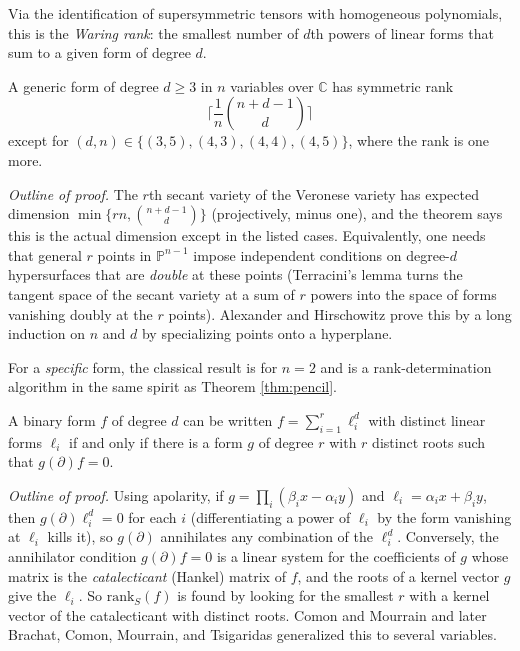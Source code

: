   Via the identification of supersymmetric tensors with homogeneous polynomials, this is the \textit{Waring rank}: the smallest number of $d$th powers of linear forms that sum to a given form of degree $d$.

  \begin{theorem}
    A generic form of degree $d \geq 3$ in $n$ variables over $\mathbb{C}$ has symmetric rank
    \begin{equation}
      \bigg\lceil \frac{1}{n} \binom{n + d - 1}{d} \bigg\rceil
    \end{equation}
    except for $(d, n) \in \{(3,5), (4,3), (4,4), (4,5)\}$, where the rank is one more.
  \end{theorem}

  \textit{Outline of proof.} The $r$th secant variety of the Veronese variety has expected dimension $\min\{r n, \binom{n+d-1}{d}\}$ (projectively, minus one), and the theorem says this is the actual dimension except in the listed cases. Equivalently, one needs that general $r$ points in $\mathbb{P}^{n-1}$ impose independent conditions on degree-$d$ hypersurfaces that are \textit{double} at these points (Terracini's lemma turns the tangent space of the secant variety at a sum of $r$ powers into the space of forms vanishing doubly at the $r$ points). Alexander and Hirschowitz prove this by a long induction on $n$ and $d$ by specializing points onto a hyperplane.

  For a \textit{specific} form, the classical result is for $n = 2$ and is a rank-determination algorithm in the same spirit as Theorem \ref{thm:pencil}.

  \begin{theorem}[Sylvester, 1851]
    A binary form $f$ of degree $d$ can be written $f = \sum_{i=1}^r \ell_i^d$ with distinct linear forms $\ell_i$ if and only if there is a form $g$ of degree $r$ with $r$ distinct roots such that $g(\partial) f = 0$.
  \end{theorem}

  \textit{Outline of proof.} Using apolarity, if $g = \prod_i (\beta_i x - \alpha_i y)$ and $\ell_i = \alpha_i x + \beta_i y$, then $g(\partial) \ell_i^d = 0$ for each $i$ (differentiating a power of $\ell_i$ by the form vanishing at $\ell_i$ kills it), so $g(\partial)$ annihilates any combination of the $\ell_i^d$. Conversely, the annihilator condition $g(\partial) f = 0$ is a linear system for the coefficients of $g$ whose matrix is the \textit{catalecticant} (Hankel) matrix of $f$, and the roots of a kernel vector $g$ give the $\ell_i$. So $\mathrm{rank}_S(f)$ is found by looking for the smallest $r$ with a kernel vector of the catalecticant with distinct roots. Comon and Mourrain and later Brachat, Comon, Mourrain, and Tsigaridas generalized this to several variables.

